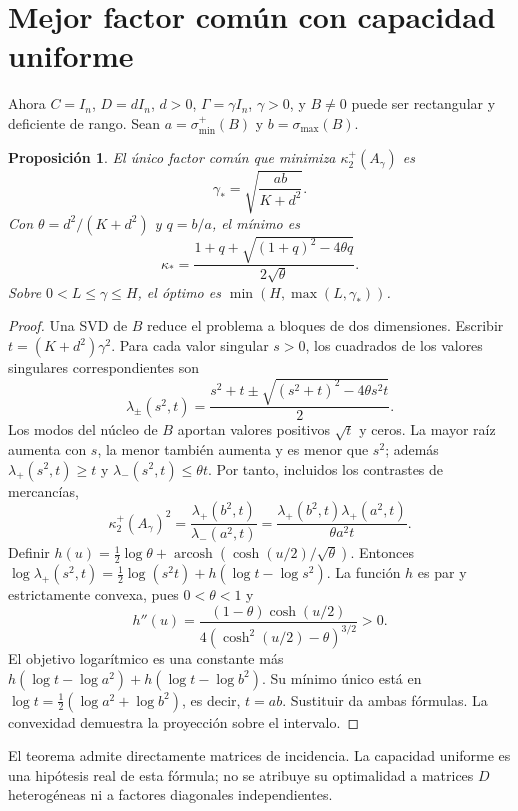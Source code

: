 \documentclass[10pt,a4paper]{article}
\newtheorem{proposition}{Proposición}
\begin{document}
\section{Mejor factor común con capacidad uniforme}
Ahora $C=I_n$, $D=dI_n$, $d>0$, $\Gamma=\gamma I_n$, $\gamma>0$, y
$B\ne0$ puede ser rectangular y deficiente de rango. Sean
$a=\sigma_{\min}^+(B)$ y $b=\sigma_{\max}(B)$.
\begin{proposition}
El único factor común que minimiza $\kappa_2^+(A_\gamma)$ es
\[
 \boxed{\gamma_* =\sqrt{\frac{ab}{K+d^2}}.}
\]
Con $\theta=d^2/(K+d^2)$ y $q=b/a$, el mínimo es
\[
 \kappa_* = \frac{1+q+\sqrt{(1+q)^2-4\theta q}}{2\sqrt\theta}.
\]
Sobre $0<L\le\gamma\le H$, el óptimo es $\min(H,\max(L,\gamma_*))$.
\end{proposition}
\begin{proof}
Una SVD de $B$ reduce el problema a bloques de dos dimensiones. Escribir
$t=(K+d^2)\gamma^2$. Para cada valor singular $s>0$, los cuadrados de los
valores singulares correspondientes son
\[
 \lambda_\pm(s^2,t)=\frac{s^2+t\pm\sqrt{(s^2+t)^2-4\theta s^2t}}2.
\]
Los modos del núcleo de $B$ aportan valores positivos $\sqrt t$ y ceros.
La mayor raíz aumenta con $s$, la menor también aumenta y es menor que $s^2$;
además $\lambda_+(s^2,t)\ge t$ y $\lambda_-(s^2,t)\le\theta t$.
Por tanto, incluidos los contrastes de mercancías,
\[
 \kappa_2^+(A_\gamma)^2
 =\frac{\lambda_+(b^2,t)}{\lambda_-(a^2,t)}
 =\frac{\lambda_+(b^2,t)\lambda_+(a^2,t)}{\theta a^2t}.
\]
Definir $h(u)=\tfrac12\log\theta+
\operatorname{arcosh}(\cosh(u/2)/\sqrt\theta)$. Entonces
$\log\lambda_+(s^2,t)=\tfrac12\log(s^2t)+h(\log t-\log s^2)$.
La función $h$ es par y estrictamente convexa, pues $0<\theta<1$ y
\[
 h''(u)=\frac{(1-\theta)\cosh(u/2)}{4(\cosh^2(u/2)-\theta)^{3/2}}>0.
\]
El objetivo logarítmico es una constante más
$h(\log t-\log a^2)+h(\log t-\log b^2)$. Su mínimo único está en
$\log t=\tfrac12(\log a^2+\log b^2)$, es decir, $t=ab$.
Sustituir da ambas fórmulas. La convexidad demuestra la proyección sobre el intervalo.
\end{proof}
El teorema admite directamente matrices de incidencia. La capacidad uniforme
es una hipótesis real de esta fórmula; no se atribuye su optimalidad a matrices
$D$ heterogéneas ni a factores diagonales independientes.
\end{document}

